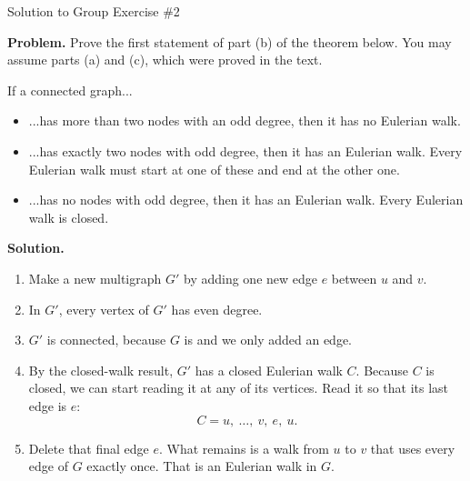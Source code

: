 \documentclass[10pt]{beamer}
\begin{document}
\begin{frame}{Solution to Group Exercise \#2}

\scriptsize  
\textbf{Problem.} Prove the first statement of part (b) of the theorem below.  You may assume parts (a) and (c), which were proved in the text.


\tiny 
 \begin{mygreenbox}[title=\text{Eulerian Walks (Theorem 7.3.1, Lovász)}]
If a connected graph...
\begin{itemize}
\item[a)] ...has more than two nodes with an odd degree, then it has no Eulerian walk.
\item[b)] ...has exactly two nodes with odd degree, then it has an Eulerian walk.  Every Eulerian walk must start at one of these and end at the other one.
\item[c)] ...has no nodes with odd degree, then it has an Eulerian walk.  Every Eulerian walk is closed.
\end{itemize}
\end{mygreenbox}

\scriptsize  

\textbf{Solution.}  

\begin{enumerate}
	\item  Make a new multigraph $G'$ by adding one new edge $e$ between $u$ and $v$.
\item In $G'$, every vertex of $G'$ has even degree.
\item $G'$ is connected, because $G$ is and we only added an edge.
\item By the closed-walk result, $G'$ has a closed Eulerian walk $C$. Because $C$ is closed, we can start reading it at any of its vertices. Read it so that its last edge is $e$:
\[ C = u,\ \dots,\ v,\ e,\ u.\]
\item Delete that final edge $e$. What remains is a walk from $u$ to $v$ that uses every edge of $G$ exactly once. That is an Eulerian walk in $G$.
\end{enumerate}	




	
\end{frame}
\end{document}
